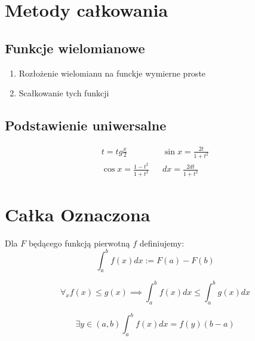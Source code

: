 
\section{Metody całkowania}
    \subsection{Funkcje wielomianowe}
        \begin{enumerate}
            \item Rozłożenie wielomianu na funckje wymierne proste
            \item Scałkowanie tych funkcji
        \end{enumerate}
        
    \subsection{Podstawienie uniwersalne}
        \begin{align*}
            t = tg \tfrac{x}{2} & &
            \sin x = \frac{2t}{1 + t^2} \\
            \cos x = \frac{1 - t^2}{1 + t^2} & &
            dx = \frac{2dt}{1 + t^2}
        \end{align*}
        
        
\section{Całka Oznaczona}
    \begin{definition}
    Dla $F$ będącego funkcją pierwotną $f$ definiujemy:
        \begin{equation*}
            \int_a^b f(x) dx := F(a) - F(b)
        \end{equation*}
    \end{definition}
    
    \begin{theorem}
        \[ \forall_x f(x) \leq g(x) \implies \int_a^b f(x) dx \leq \int_a^b g(x) dx \]
    \end{theorem}
    
    \begin{theorem}
        \[ \exists y \in (a, b)  \int_a^b f(x) dx = f(y)(b-a) \]
    \end{theorem}